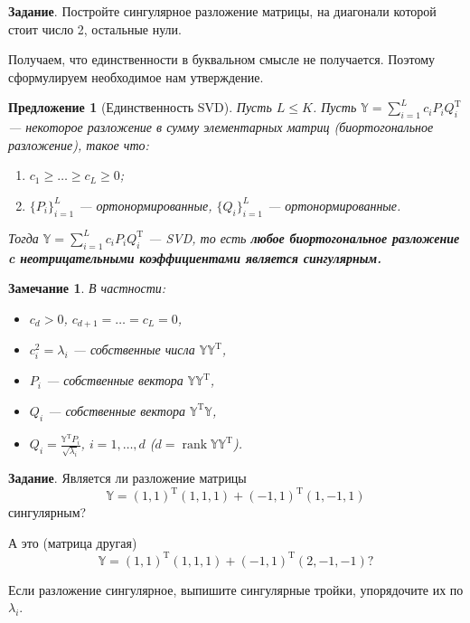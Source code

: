 \documentclass[specialist, 12pt,
subf, %
href, colorlinks=true,
substylefile = spbu.rtx,
]{disser}
\newtheorem{proposition}{Предложение}
\newtheorem{remark}{Замечание}
\DeclareMathOperator{\rnk}{rank}
\begin{document}
\textbf{Задание}. Постройте сингулярное разложение матрицы, на диагонали которой стоит число 2, остальные нули.

Получаем, что единственности в буквальном смысле не получается. Поэтому сформулируем необходимое нам утверждение.
\begin{proposition}[Единственность SVD]
	Пусть $L\le K$. Пусть $\mathbb{Y} = \sum\limits_{i = 1}^L c_i P_i Q_i^{\mathrm{T}}$ --- некоторое разложение в сумму элементарных матриц (биортогональное разложение), такое что:
	\begin{enumerate}
		\item $c_1 \geq \ldots \geq c_L \geq 0$;
		\item $\{P_i\}_{i=1}^L$ --- ортонормированные, $\{Q_i\}_{i=1}^L$ --- ортонормированные.
	\end{enumerate}
Тогда $\mathbb{Y} = \sum\limits_{i = 1}^L c_i P_i Q_i^{\mathrm{T}}$ --- SVD, то есть \textit{\textbf{любое биортогональное разложение c неотрицательными коэффициентами является сингулярным.}}
\end{proposition}



\begin{remark}
	В частности:
	\begin{itemize}
	\item $c_d > 0$, $c_{d+1} = \ldots = c_L = 0$,
	\item $c_i^2 = \lambda_i$ --- собственные числа $\mathbb{Y}\mathbb{Y}^{\mathrm{T}}$,
	\item $P_i$ --- собственные вектора $\mathbb{Y}\mathbb{Y}^{\mathrm{T}}$,
	\item $Q_i$ --- собственные вектора $\mathbb{Y}^{\mathrm{T}}\mathbb{Y}$,
	\item $Q_i = \frac{\mathbb{Y}^{\mathrm{T}} P_i}{\sqrt{\lambda_i}}$, $i = 1,\ldots,d$ ($d = \rnk\mathbb{Y}\mathbb{Y}^\mathrm{T}$).
	\end{itemize}
\end{remark}


\textbf{Задание}. Является ли разложение матрицы $$\mathbb{Y} = (1,1)^\mathrm{T} (1,1,1) + (-1,1)^\mathrm{T} (1,-1,1)$$ сингулярным? 

А это (матрица другая)
$$\mathbb{Y} = (1,1)^\mathrm{T} (1,1,1) + (-1,1)^\mathrm{T} (2,-1,-1)?$$

Если разложение сингулярное, выпишите сингулярные тройки, упорядочите их по $\lambda_i$.
\end{document}
